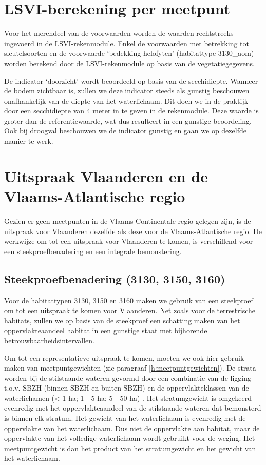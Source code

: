 \documentclass[twoside]{extreport}
\begin{document}
\section{LSVI-berekening per
meetpunt}\label{lsvi-berekening-per-meetpunt-4}

Voor het merendeel van de voorwaarden worden de waarden rechtstreeks
ingevoerd in de LSVI-rekenmodule. Enkel de voorwaarden met betrekking
tot sleutelsoorten en de voorwaarde `bedekking helofyten' (habitattype
3130\_aom) worden berekend door de LSVI-rekenmodule op basis van de
vegetatiegegevens.

De indicator `doorzicht' wordt beoordeeld op basis van de secchidiepte.
Wanneer de bodem zichtbaar is, zullen we deze indicator steeds als
gunstig beschouwen onafhankelijk van de diepte van het waterlichaam. Dit
doen we in de praktijk door een secchidiepte van 4 meter in te geven in
de rekenmodule. Deze waarde is groter dan de referentiewaarde, wat dus
resulteert in een gunstige beoordeling. Ook bij droogval beschouwen we
de indicator gunstig en gaan we op dezelfde manier te werk.

\section{Uitspraak Vlaanderen en de Vlaams-Atlantische
regio}\label{uitspraak-vlaanderen-en-de-vlaams-atlantische-regio-5}

Gezien er geen meetpunten in de Vlaams-Continentale regio gelegen zijn,
is de uitspraak voor Vlaanderen dezelfde als deze voor de
Vlaams-Atlantische regio. De werkwijze om tot een uitspraak voor
Vlaanderen te komen, is verschillend voor een steekproefbenadering en
een integrale bemonstering.

\subsection{Steekproefbenadering (3130, 3150,
3160)}\label{steekproefbenadering-3130-3150-3160}

Voor de habitattypen 3130, 3150 en 3160 maken we gebruik van een
steekproef om tot een uitspraak te komen voor Vlaanderen. Net zoals voor
de terrestrische habitats, zullen we op basis van de steekproef een
schatting maken van het oppervlakteaandeel habitat in een gunstige staat
met bijhorende betrouwbaarheidsintervallen.

Om tot een representatieve uitspraak te komen, moeten we ook hier
gebruik maken van meetpuntgewichten (zie paragraaf
\ref{h:meetpuntgewichten}). De strata worden bij de stilstaande wateren
gevormd door een combinatie van de ligging t.o.v. SBZH (binnen SBZH en
buiten SBZH) en de oppervlakteklassen van de waterlichamen (\textless{}
1 ha; 1 - 5 ha; 5 - 50 ha) \citep{Westra2014}. Het stratumgewicht is
omgekeerd evenredig met het oppervlakteaandeel van de stilstaande
wateren dat bemonsterd is binnen elk stratum. Het gewicht van het
waterlichaam is evenredig met de oppervlakte van het waterlichaam. Dus
niet de oppervlakte aan habitat, maar de oppervlakte van het volledige
waterlichaam wordt gebruikt voor de weging. Het meetpuntgewicht is dan
het product van het stratumgewicht en het gewicht van het waterlichaam.
\end{document}
